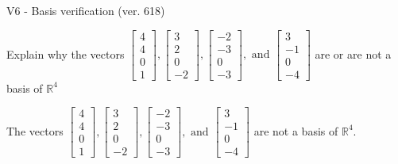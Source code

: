 \begin{exercise}
  \begin{exerciseTitle}V6 - Basis verification (ver. 618)\end{exerciseTitle}
  \begin{exerciseStatement}
    Explain why the vectors \(\left[\begin{array}{r}
4 \\
4 \\
0 \\
1
\end{array}\right] , \left[\begin{array}{r}
3 \\
2 \\
0 \\
-2
\end{array}\right] , \left[\begin{array}{r}
-2 \\
-3 \\
0 \\
-3
\end{array}\right] , \text{ and } \left[\begin{array}{r}
3 \\
-1 \\
0 \\
-4
\end{array}\right]\) are or are not a basis of \(\mathbb{R}^4\)	


  \end{exerciseStatement}
  \begin{exerciseAnswer}
   The vectors \(\left[\begin{array}{r}
4 \\
4 \\
0 \\
1
\end{array}\right] , \left[\begin{array}{r}
3 \\
2 \\
0 \\
-2
\end{array}\right] , \left[\begin{array}{r}
-2 \\
-3 \\
0 \\
-3
\end{array}\right] , \text{ and } \left[\begin{array}{r}
3 \\
-1 \\
0 \\
-4
\end{array}\right]\) 
  	 are not  a basis of \(\mathbb{R}^4\).
  


  \end{exerciseAnswer}
\end{exercise}